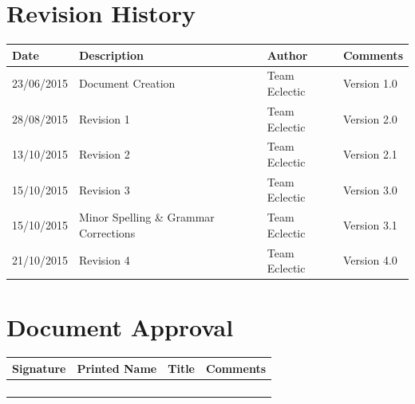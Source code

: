 \documentclass[11pt]{article}
\begin{document}


\setcounter{tocdepth}{3}
\setcounter{secnumdepth}{5}
\tableofcontents

\newpage
\section{Revision History}
\begin{table}[h]
\begin{tabular}{llll}
\textbf{Date}          & \textbf{Description}  & \textbf{Author}       & \textbf{Comments}   \\ \hline
\multicolumn{1}{|R{2cm}|}{23/06/2015} & \multicolumn{1}{L{4.5cm}|}{Document Creation} & \multicolumn{1}{l|}{Team Eclectic} & \multicolumn{1}{L{4cm}|}{Version 1.0} \\ \hline
\multicolumn{1}{|R{2cm}|}{28/08/2015} & \multicolumn{1}{L{4.5cm}|}{Revision 1} & \multicolumn{1}{l|}{Team Eclectic} & \multicolumn{1}{L{4cm}|}{Version 2.0} \\ \hline
\multicolumn{1}{|R{2cm}|}{13/10/2015} & \multicolumn{1}{L{4.5cm}|}{Revision 2} & \multicolumn{1}{l|}{Team Eclectic} & \multicolumn{1}{L{4cm}|}{Version 2.1} \\ \hline
\multicolumn{1}{|R{2cm}|}{15/10/2015} & \multicolumn{1}{L{4.5cm}|}{Revision 3} & \multicolumn{1}{l|}{Team Eclectic} & \multicolumn{1}{L{4cm}|}{Version 3.0} \\ \hline
\multicolumn{1}{|R{2cm}|}{15/10/2015} & \multicolumn{1}{L{4.5cm}|}{Minor Spelling \& Grammar Corrections} & \multicolumn{1}{l|}{Team Eclectic} & \multicolumn{1}{L{4cm}|}{Version 3.1} \\ \hline
\multicolumn{1}{|R{2cm}|}{21/10/2015} & \multicolumn{1}{L{4.5cm}|}{Revision 4} & \multicolumn{1}{l|}{Team Eclectic} & \multicolumn{1}{L{4cm}|}{Version 4.0} \\ \hline
\end{tabular}
\end{table}

\section{Document Approval}
\begin{table}[h]
\begin{tabular}{llll}
\textbf{Signature}     & \textbf{Printed Name} & \textbf{Title}        & \textbf{Comments}     \\ \hline
\multicolumn{1}{|l|}{} & \multicolumn{1}{L{3.5cm}|}{} & \multicolumn{1}{L{3.5cm}|}{} & \multicolumn{1}{L{4cm}|}{} \\ \hline
\multicolumn{1}{|l|}{} & \multicolumn{1}{l|}{} & \multicolumn{1}{l|}{} & \multicolumn{1}{l|}{} \\ \hline
\multicolumn{1}{|l|}{} & \multicolumn{1}{l|}{} & \multicolumn{1}{l|}{} & \multicolumn{1}{l|}{} \\ \hline
\multicolumn{1}{|l|}{} & \multicolumn{1}{l|}{} & \multicolumn{1}{l|}{} & \multicolumn{1}{l|}{} \\ \hline
\end{tabular}
\end{table}
\end{document}
